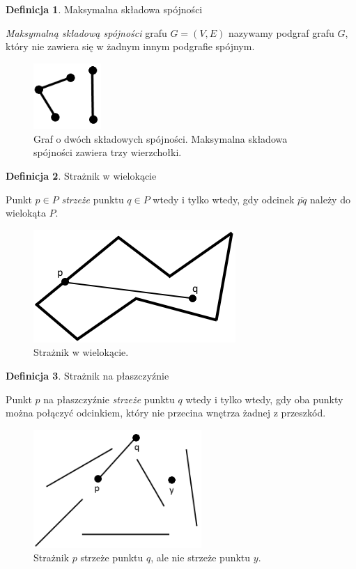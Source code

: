 \documentclass[brudnopis]{xmgr}
\theoremstyle{definition}
\newtheorem{Definicja}{Definicja}
\begin{document}
\begin{Definicja}{Maksymalna składowa spójności}
  
  \emph{Maksymalną składową spójności} grafu $G=(V,E)$ nazywamy podgraf grafu $G$, który nie zawiera się w żadnym innym podgrafie spójnym.
\end{Definicja}

\begin{figure}[ht!]
  \centering
  \includegraphics[height=2.5cm]{rysunki/graf_dwie_skladowe.png}
    \caption{Graf o dwóch składowych spójności. Maksymalna składowa spójności zawiera trzy wierzchołki.}
\end{figure} 

\begin{Definicja}{Strażnik w wielokącie}

  Punkt $p \in P$ \emph{strzeże} punktu $q \in P$ wtedy i tylko wtedy, gdy odcinek $\overline{pq}$ należy do wielokąta $P$.
\end{Definicja}

\begin{figure}[ht!]
  \centering
  \includegraphics{rysunki/straznik_wielokat.png}
    \caption{Strażnik w wielokącie.}
\end{figure} 

\begin{Definicja}{Strażnik na płaszczyźnie}\label{straznik na plaszczyznie}
	
	Punkt $p$ na płaszczyźnie \emph{strzeże} punktu $q$ wtedy i tylko wtedy, gdy oba punkty można połączyć odcinkiem, który nie przecina wnętrza żadnej z przeszkód.
\end{Definicja}

\begin{figure}[ht!]
  \centering
  \includegraphics[height=4.5cm]{rysunki/straznik_na_plaszczyznie.png}
    \caption{Strażnik $p$ strzeże punktu $q$, ale nie strzeże punktu $y$.}
\end{figure} 
\end{document}
